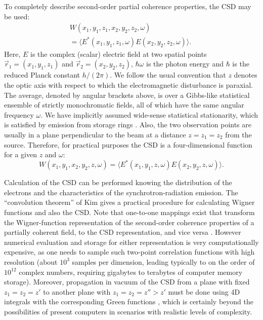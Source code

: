 \documentclass[%
 reprint,
 amsmath,amssymb,
 aps,
]{revtex4-1}
\begin{document}
To completely describe second-order partial coherence properties, the CSD \cite{Wolf1982,mandel_wolf} may be used: 
\begin{eqnarray}
\nonumber W(x_1,y_1,z_1,x_2,y_2,z_2,\omega) \quad\quad\quad\quad\quad\quad \\ = \langle E^{*}(x_1,y_1,z_1,\omega) E(x_2,y_2,z_2,\omega) \rangle.\label{eq:CSD}
\end{eqnarray}
Here, $E$ is the complex (scalar) electric field at two spatial points $\vec{r}_1=(x_1,y_1,z_1)$ and $\vec{r}_2=(x_2,y_2,z_2)$, $\hbar\omega$ is the photon energy and $\hbar$ is the reduced Planck constant $h/(2\pi)$.  We follow the usual convention that $z$ denotes the optic axis with respect to which the electromagnetic disturbance is paraxial. The average, denoted by angular brackets above, is over a Gibbs-like statistical ensemble of strictly monochromatic fields, all of which have the same angular frequency $\omega$. We have implicitly assumed wide-sense statistical stationarity, which is satisfied by emission from storage rings \cite{geloni}. Also, the two observation points are usually in a plane perpendicular to the beam at a distance $z=z_1=z_2$ from the source. Therefore, for practical purposes the CSD is a four-dimensional function for a given $z$ and $\omega$: 
\begin{equation}
W(x_1,y_1,x_2,y_2,z,\omega) = 
\langle E^{*}(x_1,y_1,z,\omega) E(x_2,y_2,z,\omega)\rangle.
\end{equation}

Calculation of the CSD can be performed knowing the distribution of the electrons and the characteristics of the synchrotron-radiation emission. The ``convolution theorem'' of Kim \cite{kim} gives a practical procedure for calculating Wigner functions \cite{Wigner1932} and also the CSD. Note that one-to-one mappings exist that transform the Wigner-function representation of the second-order coherence properties of a partially coherent field, to the CSD representation, and vice versa \cite{AlonsoWignerFunctionReview}.  However  numerical evaluation and storage for either representation is very computationally expensive, as one needs to sample such two-point correlation functions with high resolution (about $10^3$ samples per dimension, leading typically to on the order of $10^{12}$ complex numbers, requiring gigabytes to terabytes of computer memory storage). Moreover, propagation in vacuum of the CSD from a plane with fixed $z_1=z_2= z'$ to another plane with $z_1=z_2=z''>z'$ must be done using 4D integrals with the corresponding Green functions \cite{mandel_wolf}, which is certainly beyond the possibilities of present computers in scenarios with realistic levels of complexity. 
\end{document}
